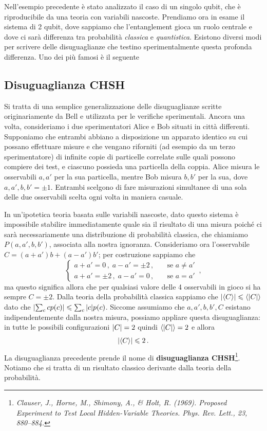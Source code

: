 \noindent Nell'esempio precedente è stato analizzato il caso di un singolo qubit, che \`e riproducibile da una teoria con variabili nascoste. Prendiamo ora in esame il sistema di 2 qubit, dove sappiamo che l'entanglement gioca un ruolo centrale e dove ci sar\`a  differenza tra probabilità \textit{classica} e \textit{quantistica}. Esistono diversi modi per scrivere delle disuguaglianze che testino sperimentalmente questa profonda differenza. Uno dei più famosi è il seguente

\subsection{Disuguaglianza CHSH}
Si tratta di una semplice generalizzazione delle  disuguaglianze scritte originariamente da Bell e utilizzata per le verifiche sperimentali. Ancora una volta, consideriamo i due sperimentatori Alice e Bob situati in città differenti. Supponiamo che entrambi abbiano a disposizione un apparato identico su cui possano effettuare misure e che vengano riforniti (ad esempio da un terzo sperimentatore) di infinite copie di particelle correlate sulle quali possono compiere dei test, e ciascuno possieda una particella della coppia. Alice misura le osservabili $a,a'$ per la sua particella, mentre Bob misura $b,b'$ per la sua, dove $a,a',b,b' = \pm 1$. Entrambi scelgono di fare misurazioni simultanee di una sola delle due osservabili scelta ogni volta in maniera casuale.

\noindent In un'ipotetica teoria basata sulle variabili nascoste, dato questo sistema è impossibile stabilire immediatamente quale sia il risultato di una misura poiché ci sarà necessariamente una distribuzione di probabilità classica, che chiamiamo $P(a,a',b,b')$, associata alla nostra ignoranza. Consideriamo ora l'osservabile $ C = (a+a') b + (a-a') b'$; per costruzione sappiamo che
\begin{equation*}
    \begin{cases}
        a+a' = 0 \, , \; a-a' = \pm 2 \, , \quad &\text{se } a \neq a' \\
        a+a' = \pm 2 \, , \; a - a' = 0 \, , \quad &\text{se } a = a'
    \end{cases} \, , 
\end{equation*}
ma questo significa allora che per qualsiasi valore delle 4 osservabili in gioco si ha sempre $C = \pm 2$. Dalla teoria della probabilità classica sappiamo che $\abs{\expval{C}} \leqslant \expval{\abs{C}}$ dato che $\abs{\sum_c c p(c)} \leqslant \sum_c \abs{c} p(c)$. Siccome assumiamo che $a,a',b,b',C$ esistano indipendentemente dalla nostra misura, possiamo appliare questa disuguaglianza: in tutte le possibili configurazioni $\abs{C} = 2$ quindi $\expval{\abs{C}} = 2$ e allora
\begin{equation}\label{CHSH_inequality}
    \abs{\expval{C}} \leqslant 2 \, .
\end{equation}
La disuguaglianza precedente prende il nome di \textbf{disuguaglianza CHSH}\footnote{\textit{Clauser, J., Horne, M., Shimony, A., \& Holt, R. (1969). Proposed Experiment to Test Local Hidden-Variable Theories. Phys. Rev. Lett., 23, 880–884.}}. Notiamo che si tratta di un risultato classico derivante dalla teoria della probabilità. 

